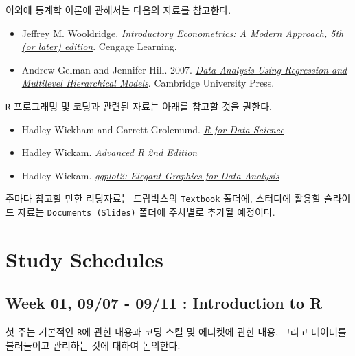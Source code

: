 \documentclass[11pt,]{article}
\begin{document}
이외에 통계학 이론에 관해서는 다음의 자료를 참고한다.

\begin{itemize}
\item
  Jeffrey M. Wooldridge.
  \href{https://www.dropbox.com/s/iq7hyck25xji1mv/Jeffrey\%20M.\%20Wooldridge-Introductory\%20Econometrics_\%20A\%20Modern\%20Approach-South-Western\%20College\%20Pub\%20\%282012\%29.pdf?dl=0}{\emph{Introductory
  Econometrics: A Modern Approach, 5th (or later) edition}}. Cengage
  Learning.
\item
  Andrew Gelman and Jennifer Hill. 2007.
  \href{https://www.dropbox.com/s/1xa7l5l60x0hfgh/Andrew\%20Gelman\%20-\%20Data\%20Analysis\%20Using\%20Regression\%20and\%20Multilevel_Hierarchical\%20Models-Cambridge\%20University\%20Press\%20\%282008\%29.pdf?dl=0}{\emph{Data
  Analysis Using Regression and Multilevel Hierarchical Models}}.
  Cambridge University Press.
\end{itemize}

\texttt{R} 프로그래밍 및 코딩과 관련된 자료는 아래를 참고할 것을 권한다.

\begin{itemize}
\item
  Hadley Wickham and Garrett Grolemund.
  \href{https://r4ds.had.co.nz/}{\emph{R for Data Science}}
\item
  Hadley Wickam. \href{https://adv-r.hadley.nz/}{\emph{Advanced R 2nd
  Edition}}
\item
  Hadley Wickam. \href{https://ggplot2-book.org/}{\emph{ggplot2: Elegant
  Graphics for Data Analysis}}
\end{itemize}

주마다 참고할 만한 리딩자료는 드랍박스의 \texttt{Textbook} 폴더에,
스터디에 활용할 슬라이드 자료는 \texttt{Documents\ (Slides)} 폴더에
주차별로 추가될 예정이다.

\hypertarget{study-schedules}{%
\section{Study Schedules}\label{study-schedules}}

\hypertarget{week-01-0907---0911-introduction-to-r}{%
\subsection{Week 01, 09/07 - 09/11 : Introduction to
R}\label{week-01-0907---0911-introduction-to-r}}

첫 주는 기본적인 \texttt{R}에 관한 내용과 코딩 스킬 및 에티켓에 관한
내용, 그리고 데이터를 불러들이고 관리하는 것에 대하여 논의한다.
\end{document}
